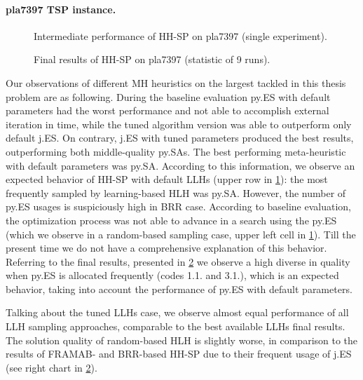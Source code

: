 \paragraph{pla7397 TSP instance.}
\begin{figure}[t]
	\centering
	\vspace{-20pt}
	
	\caption{Intermediate performance of HH-SP on pla7397 (single experiment).}
	\vspace{-10pt}
	\label{eval:pict:hh-sp:pla7397 intermediate}
\end{figure}

\begin{figure}[b]
	\centering
	\vspace{-20pt}
	
	\caption{Final results of HH-SP on pla7397 (statistic of 9 runs).}
	\vspace{-5pt}
	\label{eval:pict:hh-sp:pla7397 final}
\end{figure}
Our observations of different MH heuristics on the largest tackled in this thesis problem are as following. During the baseline evaluation py.ES with default parameters had the worst performance and not able to accomplish external iteration in time, while the tuned algorithm version was able to outperform only default j.ES. On contrary, j.ES with tuned parameters produced the best results, outperforming both middle-quality py.SAs. The best performing meta-heuristic with default parameters was py.SA. According to this information, we observe an expected behavior of HH-SP with default LLHs (upper row in \cref{eval:pict:hh-sp:pla7397 intermediate}): the most frequently sampled by learning-based HLH was py.SA. However, the number of py.ES usages is suspiciously high in BRR case. According to baseline evaluation, the optimization process was not able to advance in a search using the py.ES (which we observe in a random-based sampling case, upper left cell in \cref{eval:pict:hh-sp:pla7397 intermediate}). Till the present time we do not have a comprehensive explanation of this behavior. Referring to the final results, presented in \cref{eval:pict:hh-sp:pla7397 final} we observe a high diverse in quality when py.ES is allocated frequently (codes 1.1. and 3.1.), which is an expected behavior, taking into account the performance of py.ES with default parameters.

Talking about the tuned LLHs case, we observe almost equal performance of all LLH sampling approaches, comparable to the best available LLHs final results. The solution quality of random-based HLH is slightly worse, in comparison to the results of FRAMAB- and BRR-based HH-SP due to their frequent usage of j.ES (see right chart in \cref{eval:pict:hh-sp:pla7397 final}).

